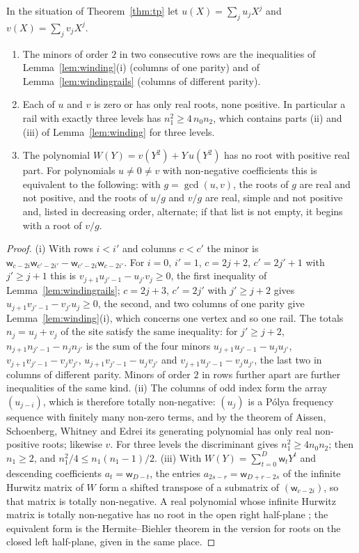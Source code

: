 \begin{corollary}\label{cor:tp}
In the situation of Theorem~\ref{thm:tp} let $u(X)=\sum_ju_jX^j$ and $v(X)=\sum_jv_jX^j$.
\begin{enumerate}[label=(\roman*)]
\item The minors of order $2$ in two consecutive rows are the inequalities of Lemma~\ref{lem:winding}(i) (columns of one parity) and of Lemma~\ref{lem:windingrails} (columns of different parity).
\item Each of $u$ and $v$ is zero or has only real roots, none positive. In particular a rail with exactly three levels has $n_1^{2}\ge4\,n_0n_2$, which contains parts (ii) and (iii) of Lemma~\ref{lem:winding} for three levels.
\item The polynomial $W(Y)=v(Y^{2})+Y\,u(Y^{2})$ has no root with positive real part. For polynomials $u\ne0\ne v$ with non-negative coefficients this is equivalent to the following: with $g=\gcd(u,v)$, the roots of $g$ are real and not positive, and the roots of $u/g$ and $v/g$ are real, simple and not positive and, listed in decreasing order, alternate; if that list is not empty, it begins with a root of $v/g$.
\end{enumerate}
\end{corollary}
\begin{proof}
(i) With rows $i<i'$ and columns $c<c'$ the minor is $\mathsf{w}_{c-2i}\mathsf{w}_{c'-2i'}-\mathsf{w}_{c'-2i}\mathsf{w}_{c-2i'}$. For $i=0$, $i'=1$, $c=2j+2$, $c'=2j'+1$ with $j'\ge j+1$ this is $v_{j+1}u_{j'-1}-u_{j'}v_j\ge0$, the first inequality of Lemma~\ref{lem:windingrails}; $c=2j+3$, $c'=2j'$ with $j'\ge j+2$ gives $u_{j+1}v_{j'-1}-v_{j'}u_j\ge0$, the second, and two columns of one parity give Lemma~\ref{lem:winding}(i), which concerns one vertex and so one rail. The totals $n_j=u_j+v_j$ of the site satisfy the same inequality: for $j'\ge j+2$, $n_{j+1}n_{j'-1}-n_jn_{j'}$ is the sum of the four minors $u_{j+1}u_{j'-1}-u_ju_{j'}$, $v_{j+1}v_{j'-1}-v_jv_{j'}$, $u_{j+1}v_{j'-1}-u_jv_{j'}$ and $v_{j+1}u_{j'-1}-v_ju_{j'}$, the last two in columns of different parity. Minors of order $2$ in rows further apart are further inequalities of the same kind.
(ii) The columns of odd index form the array $(u_{j-i})$, which is therefore totally non-negative: $(u_j)$ is a P\'olya frequency sequence with finitely many non-zero terms, and by the theorem of Aissen, Schoenberg, Whitney and Edrei \cite{aswe} its generating polynomial has only real non-positive roots; likewise $v$. For three levels the discriminant gives $n_1^{2}\ge4n_0n_2$; then $n_1\ge2$, and $n_1^{2}/4\le n_1(n_1-1)/2$.
(iii) With $W(Y)=\sum_{t=0}^{D}\mathsf{w}_tY^t$ and descending coefficients $a_t=\mathsf{w}_{D-t}$, the entries $a_{2s-r}=\mathsf{w}_{D+r-2s}$ of the infinite Hurwitz matrix of $W$ form a shifted transpose of a submatrix of $(\mathsf{w}_{c-2i})$, so that matrix is totally non-negative. A real polynomial whose infinite Hurwitz matrix is totally non-negative has no root in the open right half-plane \cite[Theorem~3.44]{holtztyaglov}; the equivalent form is the Hermite--Biehler theorem in the version for roots on the closed left half-plane, given in the same place.
\end{proof}

